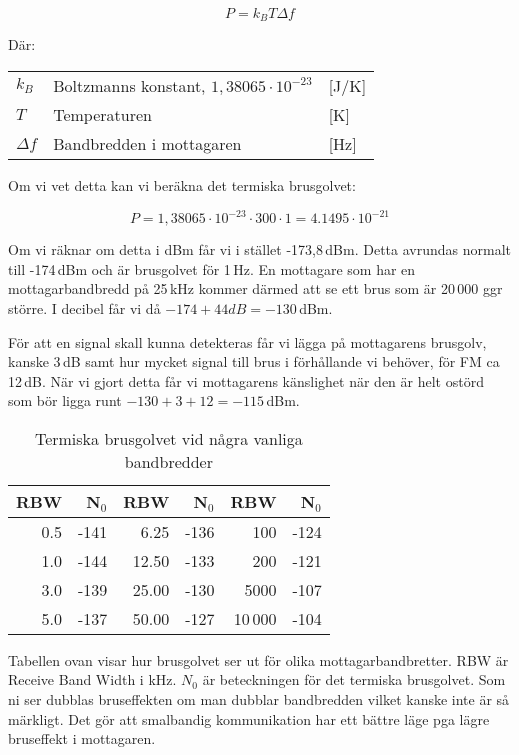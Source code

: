 $$P=k_BT\Delta f$$

Där:

\begin{tabular}{lll}
	$k_B$      & Boltzmanns konstant, $1,38065\cdot 10^{-23}$ & [J/K] \\
	$T$        & Temperaturen                                 & [K]   \\
	$\Delta f$ & Bandbredden i mottagaren                     & [Hz]
\end{tabular}

Om vi vet detta kan vi beräkna det termiska brusgolvet:

$$P = 1,38065\cdot 10^{-23} \cdot 300 \cdot 1 = 4.1495\cdot 10^{-21}$$

Om vi räknar om detta i dBm får vi i stället -173,8\,dBm. Detta avrundas
normalt till -174\,dBm och är brusgolvet för 1\,Hz. En mottagare som har en
mottagarbandbredd på 25\,kHz kommer därmed att se ett brus som är 20\,000 ggr
större. I decibel får vi då $-174 + 44 dB = -130$\,dBm.

För att en signal skall kunna detekteras får vi lägga på mottagarens brusgolv,
kanske 3\,dB samt hur mycket signal till brus i förhållande vi behöver, för FM
ca 12\,dB. När vi gjort detta får vi mottagarens känslighet när den är helt
ostörd som bör ligga runt $-130 + 3 + 12 = -115$\,dBm.

\begin{table}[H]
\centering
\begin{tabular}{rr|rr|rr}
	\textbf{RBW} & \textbf{N$_0$} & \textbf{RBW} & \textbf{N$_0$} & \textbf{RBW} & \textbf{N$_0$} \\ \hline
	         0.5 &           -141 &         6.25 &           -136 &          100 &           -124 \\
	         1.0 &           -144 &        12.50 &           -133 &          200 &           -121 \\
	         3.0 &           -139 &        25.00 &           -130 &         5000 &           -107 \\
	         5.0 &           -137 &        50.00 &           -127 &        10\,000 &           -104
\end{tabular}
\caption{Termiska brusgolvet vid några vanliga bandbredder}
\end{table}

Tabellen ovan visar hur brusgolvet ser ut för olika mottagarbandbretter. RBW
är Receive Band Width i kHz. $N_0$ är beteckningen för det termiska
brusgolvet. Som ni ser dubblas bruseffekten om man dubblar bandbredden vilket
kanske inte är så märkligt. Det gör att smalbandig kommunikation har ett
bättre läge pga lägre bruseffekt i mottagaren.


